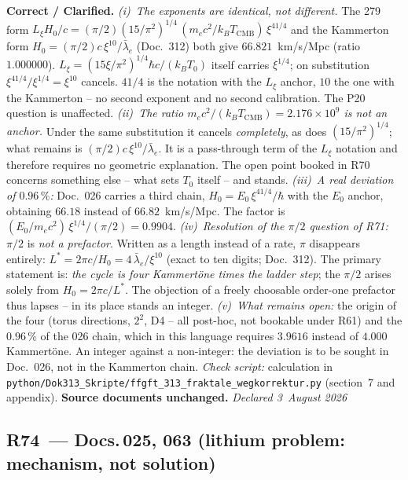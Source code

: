\smallskip\noindent\textbf{Correct / Clarified.}\quad
\emph{(i)~The exponents are identical, not different.} The 279 form
$L_\xi H_0/c = (\pi/2)(15/\pi^2)^{1/4}\,(m_ec^2/k_BT_\text{CMB})\,
\xi^{41/4}$ and the Kammerton form $H_0 = (\pi/2)c\,\xi^{10}/
\bar\lambda_e$ (Doc.~312) both give $66.821$~km/s/Mpc (ratio
$1.000000$). $L_\xi = (15\xi/\pi^2)^{1/4}\hbar c/(k_BT_0)$ itself
carries $\xi^{1/4}$; on substitution $\xi^{41/4}/\xi^{1/4} = \xi^{10}$
cancels. $41/4$ is the notation with the $L_\xi$ anchor, $10$ the one
with the Kammerton -- no second exponent and no second calibration. The
P20 question is unaffected. \emph{(ii)~The ratio
$m_ec^2/(k_BT_\text{CMB}) = 2.176\times10^9$ is not an anchor.} Under
the same substitution it cancels \emph{completely}, as does
$(15/\pi^2)^{1/4}$; what remains is $(\pi/2)c\,\xi^{10}/\bar\lambda_e$.
It is a pass-through term of the $L_\xi$ notation and therefore requires
no geometric explanation. The open point booked in R70 concerns
something else -- what sets $T_0$ itself -- and stands.
\emph{(iii)~A real deviation of $0.96\,\%$:} Doc.~026 carries a third
chain, $H_0 = E_0\,\xi^{41/4}/\hbar$ with the $E_0$ anchor, obtaining
$66.18$ instead of $66.82$~km/s/Mpc. The factor is
$(E_0/m_ec^2)\,\xi^{1/4}/(\pi/2) = 0.9904$. \emph{(iv)~Resolution of the
$\pi/2$ question of R71:} $\pi/2$ is \emph{not a prefactor}. Written
as a length instead of a rate, $\pi$ disappears entirely:
$L^{*} = 2\pi c/H_0 = 4\,\bar\lambda_e/\xi^{10}$ (exact to ten
digits; Doc.~312). The primary statement is: \emph{the cycle is four
Kammertöne times the ladder step}; the $\pi/2$ arises solely from
$H_0 = 2\pi c/L^{*}$. The objection of a freely choosable order-one
prefactor thus lapses -- in its place stands an integer.
\emph{(v)~What remains open:} the origin of the four (torus
directions, $2^2$, D4 -- all post-hoc, not bookable under R61) and the
$0.96\,\%$ of the 026 chain, which in this language requires $3.9616$
instead of $4.000$ Kammertöne. An integer against a non-integer: the
deviation is to be sought in Doc.~026, not in the Kammerton chain. \emph{Check script:} calculation in
\texttt{python/Dok313\_Skripte/ffgft\_313\_fraktale\_wegkorrektur.py}
(section~7 and appendix). \textbf{Source documents unchanged.}
\emph{Declared 3~August 2026}

\medskip

\subsection*{R74~--- Docs.\,025, 063 (lithium problem: mechanism,
not solution)}

